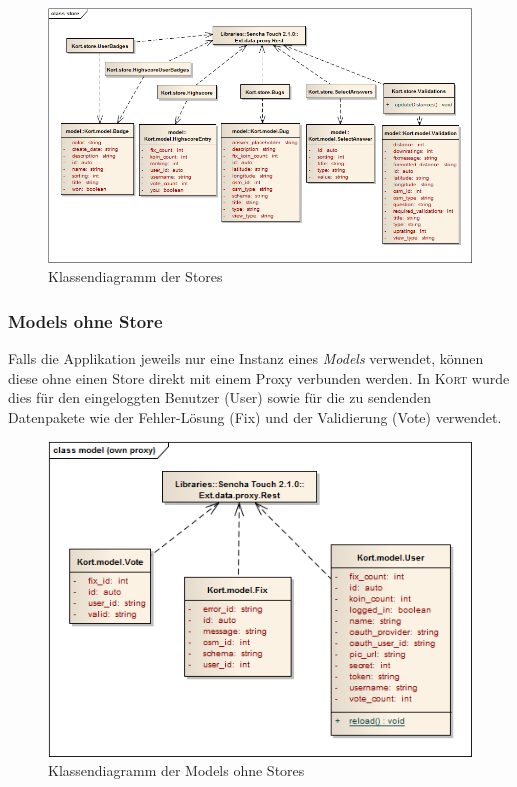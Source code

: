 \begin{figure}[H]
	\centering
	\includegraphics[width=\textwidth]{images/uml/kort-classdiagram-store}
	\caption{Klassendiagramm der Stores}
	\label{image-kort-classdiagram-store}
\end{figure}

\subsubsection{Models ohne Store}

Falls die Applikation jeweils nur eine Instanz eines \emph{Models} verwendet, können diese ohne einen Store direkt mit einem Proxy verbunden werden.
In \textsc{Kort} wurde dies für den eingeloggten Benutzer (User) sowie für die zu sendenden Datenpakete wie der Fehler-Lösung (Fix) und der Validierung (Vote) verwendet.

\begin{figure}[H]
	\centering
	\includegraphics[scale=0.6]{images/uml/kort-classdiagram-model_own_proxy}
	\caption{Klassendiagramm der Models ohne Stores}
	\label{image-kort-classdiagram-model_own_proxy}
\end{figure}


